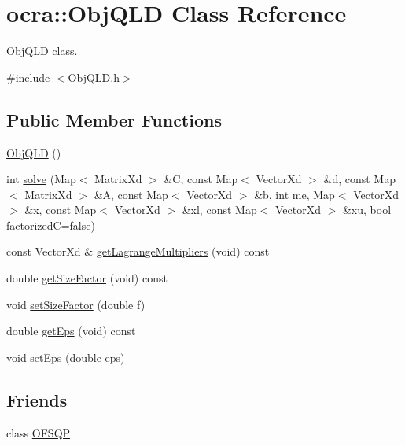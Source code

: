 \hypertarget{classocra_1_1ObjQLD}{}\section{ocra\+:\+:Obj\+Q\+LD Class Reference}
\label{classocra_1_1ObjQLD}


Obj\+Q\+LD class.  




{\ttfamily \#include $<$Obj\+Q\+L\+D.\+h$>$}

\subsection*{Public Member Functions}
\begin{DoxyCompactItemize}
\item 
\hyperlink{classocra_1_1ObjQLD_a947a8380d40c94bdcec2f228df03eac1}{Obj\+Q\+LD} ()
\item 
int \hyperlink{classocra_1_1ObjQLD_a9d2b34b957b7c3868aefde7ef7017573}{solve} (Map$<$ Matrix\+Xd $>$ \&C, const Map$<$ Vector\+Xd $>$ \&d, const Map$<$ Matrix\+Xd $>$ \&A, const Map$<$ Vector\+Xd $>$ \&b, int me, Map$<$ Vector\+Xd $>$ \&x, const Map$<$ Vector\+Xd $>$ \&xl, const Map$<$ Vector\+Xd $>$ \&xu, bool factorizedC=false)
\item 
const Vector\+Xd \& \hyperlink{classocra_1_1ObjQLD_ad462944e0ed165514f301a1b739e3314}{get\+Lagrange\+Multipliers} (void) const
\item 
double \hyperlink{classocra_1_1ObjQLD_a4ca6b476104cb59e6e533fec778fc437}{get\+Size\+Factor} (void) const
\item 
void \hyperlink{classocra_1_1ObjQLD_a79e0e04d6db99b053174e9298aa2c45d}{set\+Size\+Factor} (double f)
\item 
double \hyperlink{classocra_1_1ObjQLD_afe990f46474b7a298c7180d6839c47dc}{get\+Eps} (void) const
\item 
void \hyperlink{classocra_1_1ObjQLD_a6fb05dae8b643ba2dd9e03aac8cde624}{set\+Eps} (double eps)
\end{DoxyCompactItemize}
\subsection*{Friends}
\begin{DoxyCompactItemize}
\item 
class \hyperlink{classocra_1_1ObjQLD_a35ebfe61821cfb93672b26cc472c939e}{O\+F\+S\+QP}
\end{DoxyCompactItemize}


